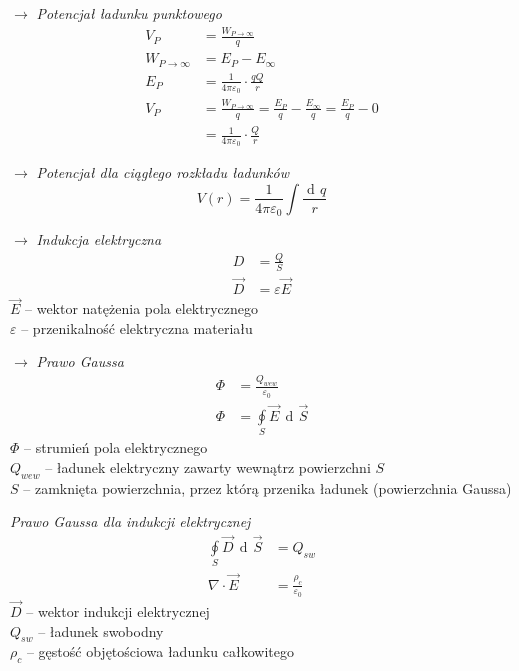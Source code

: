 \documentclass[12pt]{article}
\newenvironment{wzor}[1]{\par{\Large $\longrightarrow$ \textit{#1}}}
    {\newline {\color{grey} \rule{\linewidth}{0.3pt}}}
\DeclareMathOperator{\der}{\operatorname{d}\!}
\begin{document}
\newpage

\begin{wzor}{Potencjał ładunku punktowego}
    \begin{equation}
        \begin{split}
            V_P &= \frac{W_{P \to \infty}}{q}\\
            W_{P \to \infty} &= E_P - E_\infty\\
            E_P &= \frac{1}{4\pi\varepsilon_0} \cdot \frac{qQ}{r}\\
            V_P &= \frac{W_{P \to \infty}}{q} = \frac{E_P}{q} - \frac{E_\infty}{q} = \frac{E_P}{q} - 0\\
            &= \frac{1}{4\pi\varepsilon_0} \cdot \frac{Q}{r}
        \end{split}
    \end{equation}
\end{wzor}

\begin{wzor}{Potencjał dla ciągłego rozkładu ładunków}
    \begin{equation}
        V(r) = \frac{1}{4\pi\varepsilon_0} \int \frac{\der q}{r}
    \end{equation}
\end{wzor}

\begin{wzor}{Indukcja elektryczna}
    \begin{align}
        D &= \frac{Q}{S}\\
        \Vec{D} &= \varepsilon \Vec{E}
    \end{align}
    $\Vec{E}$ -- wektor natężenia pola elektrycznego\\
    $\varepsilon$ -- przenikalność elektryczna materiału
\end{wzor}

\begin{wzor}{Prawo Gaussa}
    \begin{align}
        \Phi &= \frac{Q_{wew}}{\varepsilon_0}\\
        \Phi &= \oint\limits_S \Vec{E} \, \der \Vec{S}
    \end{align}
    $\Phi$ -- strumień pola elektrycznego\\
    $Q_{wew}$ -- ładunek elektryczny zawarty wewnątrz powierzchni $S$\\
    $S$ -- zamknięta powierzchnia, przez którą przenika ładunek (powierzchnia Gaussa)
    \newpage
    \par {\textit{Prawo Gaussa dla indukcji elektrycznej}}
    \begin{align}
        \oint\limits_S \Vec{D} \, \der\Vec{S} &= Q_{sw} \\
        \nabla \cdot \Vec{E} &= \frac{\rho_c}{\varepsilon_0}
    \end{align}
    $\Vec{D}$ -- wektor indukcji elektrycznej\\
    $Q_{sw}$ -- ładunek swobodny\\
    $\rho_c$ -- gęstość objętościowa ładunku całkowitego
\end{wzor}
\end{document}
